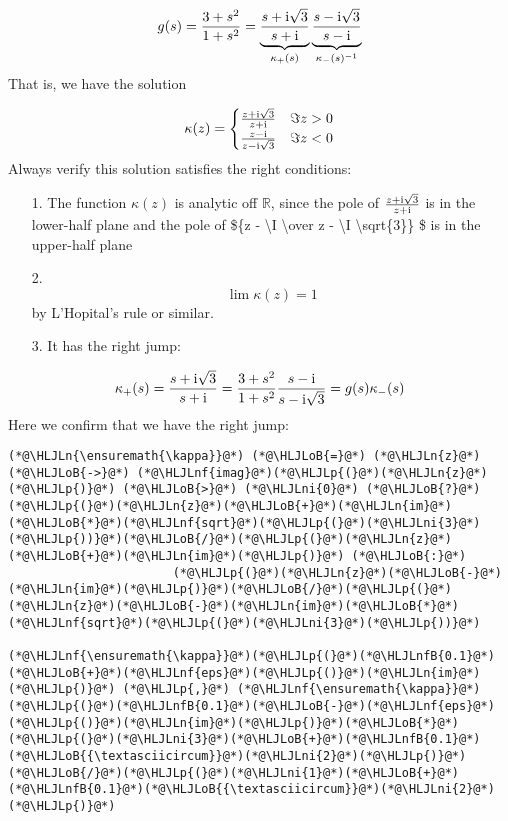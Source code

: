 \documentclass[12pt,landscape]{article}
\newcommand{\HLJLn}[1]{#1}
\newcommand{\HLJLnf}[1]{\textcolor[RGB]{66,102,213}{#1}}
\newcommand{\HLJLnfB}[1]{\textcolor[RGB]{59,151,46}{#1}}
\newcommand{\HLJLni}[1]{\textcolor[RGB]{59,151,46}{#1}}
\newcommand{\HLJLoB}[1]{\textcolor[RGB]{102,102,102}{\textbf{#1}}}
\newcommand{\HLJLp}[1]{#1}
\def\I{ {\rm i} }
\def\R{ {\mathbb R} }
\begin{document}
{\[
g(s) = {3 + s^2 \over 1 + s^2} = \underbrace{s + \I \sqrt{3} \over s + \I}_{\kappa_+(s)}
\underbrace{s - \I \sqrt{3} \over s-\I }_{\kappa_-(s)^{-1}}
\]
That is, we have the solution

\[
\kappa(z) = \begin{cases} {z + \I \sqrt{3} \over z + \I}  & \Im z > 0 \\
                            {z - \I  \over z - \I \sqrt{3}} & \Im z < 0
                            \end{cases}
\]
Always verify this solution satisfies the right conditions:

\begin{itemize}
\item[1. ] The function $\kappa(z)$ is analytic off $\R$, since the pole of ${z + \I \sqrt{3} \over z + \I}$ is in the lower-half plane and the pole of \$\{z - {\textbackslash}I  {\textbackslash}over z - {\textbackslash}I {\textbackslash}sqrt\{3\}\} \$ is in the upper-half plane


\item[2. ] \[
\lim \kappa(z) = 1
\]
by L'Hopital's rule or similar.


\item[3. ] It has the right jump:

\end{itemize}
\[
\kappa_+(s) = {s + \I \sqrt{3} \over s + \I} = {3 + s^2 \over 1 + s^2}{s - \I  \over s - \I \sqrt{3}} = g(s)\kappa_-(s)
\]
Here we confirm that we have the right jump:


\begin{lstlisting}
(*@\HLJLn{\ensuremath{\kappa}}@*) (*@\HLJLoB{=}@*) (*@\HLJLn{z}@*) (*@\HLJLoB{->}@*) (*@\HLJLnf{imag}@*)(*@\HLJLp{(}@*)(*@\HLJLn{z}@*)(*@\HLJLp{)}@*) (*@\HLJLoB{>}@*) (*@\HLJLni{0}@*) (*@\HLJLoB{?}@*) (*@\HLJLp{(}@*)(*@\HLJLn{z}@*)(*@\HLJLoB{+}@*)(*@\HLJLn{im}@*)(*@\HLJLoB{*}@*)(*@\HLJLnf{sqrt}@*)(*@\HLJLp{(}@*)(*@\HLJLni{3}@*)(*@\HLJLp{))}@*)(*@\HLJLoB{/}@*)(*@\HLJLp{(}@*)(*@\HLJLn{z}@*)(*@\HLJLoB{+}@*)(*@\HLJLn{im}@*)(*@\HLJLp{)}@*) (*@\HLJLoB{:}@*)
                       (*@\HLJLp{(}@*)(*@\HLJLn{z}@*)(*@\HLJLoB{-}@*)(*@\HLJLn{im}@*)(*@\HLJLp{)}@*)(*@\HLJLoB{/}@*)(*@\HLJLp{(}@*)(*@\HLJLn{z}@*)(*@\HLJLoB{-}@*)(*@\HLJLn{im}@*)(*@\HLJLoB{*}@*)(*@\HLJLnf{sqrt}@*)(*@\HLJLp{(}@*)(*@\HLJLni{3}@*)(*@\HLJLp{))}@*)

(*@\HLJLnf{\ensuremath{\kappa}}@*)(*@\HLJLp{(}@*)(*@\HLJLnfB{0.1}@*)(*@\HLJLoB{+}@*)(*@\HLJLnf{eps}@*)(*@\HLJLp{()}@*)(*@\HLJLn{im}@*)(*@\HLJLp{)}@*) (*@\HLJLp{,}@*) (*@\HLJLnf{\ensuremath{\kappa}}@*)(*@\HLJLp{(}@*)(*@\HLJLnfB{0.1}@*)(*@\HLJLoB{-}@*)(*@\HLJLnf{eps}@*)(*@\HLJLp{()}@*)(*@\HLJLn{im}@*)(*@\HLJLp{)}@*)(*@\HLJLoB{*}@*)(*@\HLJLp{(}@*)(*@\HLJLni{3}@*)(*@\HLJLoB{+}@*)(*@\HLJLnfB{0.1}@*)(*@\HLJLoB{{\textasciicircum}}@*)(*@\HLJLni{2}@*)(*@\HLJLp{)}@*)(*@\HLJLoB{/}@*)(*@\HLJLp{(}@*)(*@\HLJLni{1}@*)(*@\HLJLoB{+}@*)(*@\HLJLnfB{0.1}@*)(*@\HLJLoB{{\textasciicircum}}@*)(*@\HLJLni{2}@*)(*@\HLJLp{)}@*)
\end{lstlisting}

}
\end{document}
